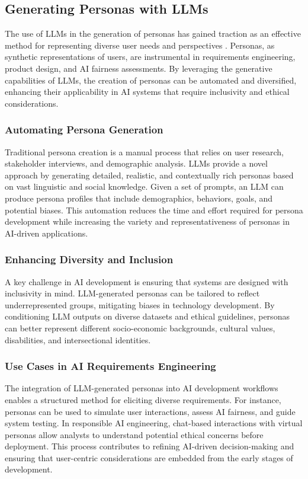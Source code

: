 \subsection{Generating Personas with LLMs}

The use of LLMs in the generation of personas has gained traction as an effective method for representing diverse user needs and perspectives \cite{10.1145/3643691.3648587}. Personas, as synthetic 
representations of users, are instrumental in requirements engineering, product design, and AI fairness assessments. By leveraging the generative capabilities of LLMs, 
the creation of personas can be automated and diversified, enhancing their applicability in AI systems that require inclusivity and ethical considerations.

\subsubsection{Automating Persona Generation}
Traditional persona creation is a manual process that relies on user research, stakeholder interviews, and demographic analysis. LLMs provide a novel approach by generating detailed, realistic, 
and contextually rich personas based on vast linguistic and social knowledge. Given a set of prompts, an LLM can produce persona profiles that include demographics, behaviors, goals, and potential 
biases. This automation reduces the time and effort required for persona development while increasing the variety and representativeness of personas in AI-driven applications.

\subsubsection{Enhancing Diversity and Inclusion}
A key challenge in AI development is ensuring that systems are designed with inclusivity in mind. LLM-generated personas can be tailored to reflect underrepresented groups, mitigating biases in 
technology development. By conditioning LLM outputs on diverse datasets and ethical guidelines, personas can better represent different socio-economic backgrounds, cultural values, disabilities, 
and intersectional identities.

\subsubsection{Use Cases in AI Requirements Engineering}
The integration of LLM-generated personas into AI development workflows enables a structured method for eliciting diverse requirements. For instance, personas can be used to simulate user interactions, 
assess AI fairness, and guide system testing. In responsible AI engineering, chat-based interactions with virtual personas allow analysts to understand potential ethical concerns before deployment. 
This process contributes to refining AI-driven decision-making and ensuring that user-centric considerations are embedded from the early stages of development.

